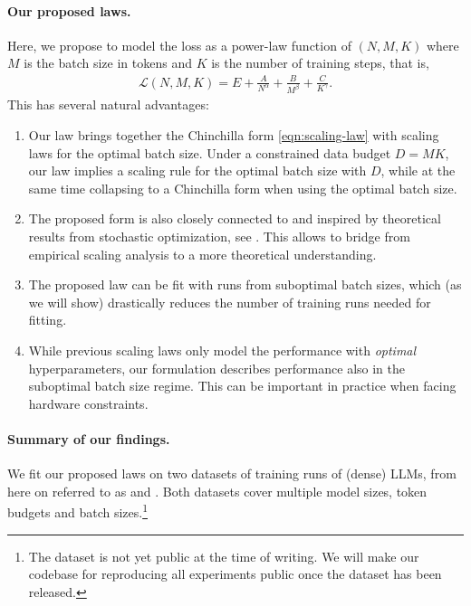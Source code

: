 \documentclass[12pt,a4paper,twoside]{article}
\begin{document}
\paragraph{Our proposed laws.} Here, we propose to model the loss as a power-law function of $(N,M,K)$ where $M$ is the batch size in tokens and $K$ is the number of training steps, 
%
that is,
\begin{align*}
    \mathcal{L}(N,M,K) = E + \frac{A}{N^\alpha} + \frac{B}{M^\beta} + \frac{C}{K^\gamma}.
\end{align*}
%
This has several natural advantages:
%
\begin{enumerate}[label=(\roman*)]
    \item Our law brings together the Chinchilla form \eqref{eqn:scaling-law} with scaling laws for the optimal batch size. Under a constrained data budget $D=MK$, our law implies a scaling rule for the optimal batch size with $D$, while at the same time collapsing to a Chinchilla form when using the optimal batch size.
    \item The proposed form is also closely connected to and inspired by theoretical results from stochastic optimization, see \citet{Shulgin2026,Kovalev2025}. This allows to bridge from empirical scaling analysis to a more theoretical understanding.
    \item The proposed law can be fit with runs from suboptimal batch sizes, which (as we will show) drastically reduces the number of training runs needed for fitting.
    \item While previous scaling laws only model the performance with \emph{optimal} hyperparameters, our formulation describes performance also in the suboptimal batch size regime. This can be important in practice when facing hardware constraints.
\end{enumerate}

\paragraph{Summary of our findings.} 

We fit our proposed laws on two datasets of training runs of (dense) LLMs, from here on referred to as \li{} \citep{Li2025} and \oellm{} \citep{OpenEuroLLM2026}. Both datasets cover multiple model sizes, token budgets and batch sizes.\footnote{The \oellm{} dataset is not yet public at the time of writing. We will make our codebase for reproducing all experiments public once the \oellm{} dataset has been released.}
\end{document}
